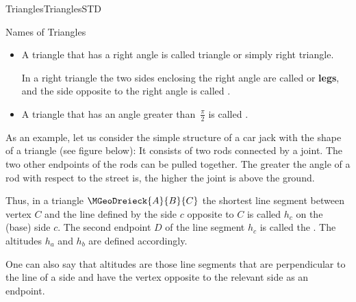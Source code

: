 \begin{MXContent}{Triangles}{Triangles}{STD}
\begin{MXInfo}{Names of Triangles}
\begin{itemize}
 \item A triangle that has a right angle is called  
  triangle or simply right triangle.

  In a right triangle the two sides enclosing the right angle are called 
   or \textbf{legs}, and the side opposite to the right angle
  is called .    

 \item A triangle that has an angle greater than~$\frac{\pi}{2}$ is called 
  .
\end{itemize}
\end{MXInfo}

As an example, let us consider the simple structure of a car jack with the shape of a triangle (see figure below):
It consists of two rods connected by a joint. The two other endpoints of the rods can be pulled 
together. The greater the angle of a rod with respect to the street is, the higher the joint is 
above the ground.

\begin{center}
\end{center}

Thus, in a triangle $\MGeoDreieck{A}{B}{C}$ the shortest line segment between vertex $C$ and 
the line defined by the side $c$ opposite to $C$ is called  
 $h_c$ on the (base) side $c$.
The second endpoint $D$ of the line segment $h_c$ is called the . The altitudes $h_a$ and 
$h_b$ are defined accordingly.

One can also say that altitudes are those line segments that are perpendicular to the 
line of a side and have the vertex opposite to the relevant side as an endpoint. 
\end{MXContent}


